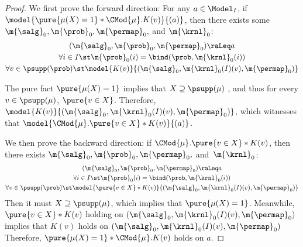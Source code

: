 \begin{proof}
  We first prove the forward direction:
  For any $a \in \Model_I$,
  if $\model{\pure{\mu(X) = 1} \ast \CMod{\mu}. K(v)}{(a)}$,
  then there exists some
  $\m{\salg}_0, \m{\prob}_0,\m{\permap}_0,$ and $ \m{\krnl}_0 $:
  \begin{gather*}
    (\m{\salg}_0, \m{\prob}_0,\m{\permap}_0) \raLeq a
    \\
    \forall i\in I\st
      \m{\prob}_0(i) = \bind(\prob, \m{\krnl}_0(i)) \\
      \forall v \in \psupp(\prob) \st
      \model{K(v)}{(\m{\salg}_0, \m{\krnl}_0(I)(v), \m{\permap}_0)}
  \end{gather*}

   The pure fact $\pure{\mu(X) = 1}$ implies that
   $X \supseteq \psupp(\mu)$ , and thus
   for every $v \in \psupp(\mu)$, $\pure{v \in X}$.
   Therefore, $\model{K(v)}{(\m{\salg}_0, \m{\krnl}_0(I)(v), \m{\permap}_0)}$,
   which witnesses that
   $\model{\CMod{\mu}. \pure{v \in X} \ast K(v)}{(a)}$.

  We then prove the backward direction:
  if $\CMod{\mu}. \pure{v \in X} \ast K(v) $,
  then there exists
    $\m{\salg}_0, \m{\prob}_0,\m{\permap}_0,$ and~$ \m{\krnl}_0 $:
  \begin{gather*}
    (\m{\salg}_0, \m{\prob}_0,\m{\permap}_0) \raLeq a
    \\
    \forall i\in I\st
      \m{\prob}_0(i) = \bind(\prob, \m{\krnl}_0(i)) \\
      \forall v \in \psupp(\prob) \st
      \model{\pure{v \in X} \ast K(v)}{(\m{\salg}_0, \m{\krnl}_0(I)(v), \m{\permap}_0)}
  \end{gather*}
  Then it must $X \supseteq \psupp(\mu)$,
  which implies that $\pure{\mu(X) = 1}$.
  Meanwhile, $\pure{v \in X} \ast K(v)$ holding on ${(\m{\salg}_0, \m{\krnl}_0(I)(v), \m{\permap}_0)}$
  implies that $K(v)$ holds on
  ${(\m{\salg}_0, \m{\krnl}_0(I)(v), \m{\permap}_0)}$
  Therefore, $\pure{\mu(X) = 1} \ast \CMod{\mu}. K(v)$ holds on $a$.
\end{proof}
